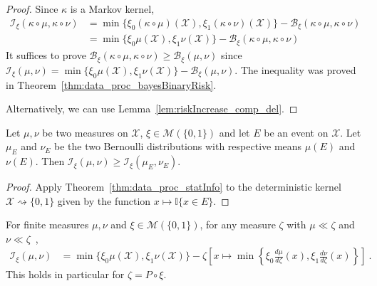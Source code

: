 \begin{proof}\leanok
{}
Since $\kappa$ is a Markov kernel,
\begin{align*}
\mathcal I_\xi(\kappa \circ \mu, \kappa \circ \nu)
&= \min\{\xi_0(\kappa \circ \mu)(\mathcal X), \xi_1(\kappa \circ \nu)(\mathcal X)\} - \mathcal B_\xi(\kappa \circ \mu, \kappa \circ \nu)
\\
&= \min\{\xi_0 \mu(\mathcal X), \xi_1 \nu(\mathcal X)\} - \mathcal B_\xi(\kappa \circ \mu, \kappa \circ \nu)
\end{align*}
It suffices to prove $\mathcal B_\xi(\kappa \circ \mu, \kappa \circ \nu) \ge \mathcal B_\xi(\mu, \nu)$ since $\mathcal I_\xi(\mu, \nu) = \min\{\xi_0\mu(\mathcal X), \xi_1\nu(\mathcal X)\} - \mathcal B_\xi(\mu, \nu)$.
The inequality was proved in Theorem~\ref{thm:data_proc_bayesBinaryRisk}.

Alternatively, we can use Lemma~\ref{lem:riskIncrease_comp_del}.
\end{proof}


\begin{corollary}
  \label{cor:statInfo_data_proc_event}
  \leanok
  Let $\mu, \nu$ be two measures on $\mathcal X$, $\xi \in \mathcal M(\{0,1\})$ and let $E$ be an event on $\mathcal X$. Let $\mu_E$ and $\nu_E$ be the two Bernoulli distributions with respective means $\mu(E)$ and $\nu(E)$.
  Then $\mathcal I_\xi(\mu, \nu) \ge \mathcal I_\xi(\mu_E, \nu_E)$.
\end{corollary}

\begin{proof}\leanok
{}
Apply Theorem~\ref{thm:data_proc_statInfo} to the deterministic kernel $\mathcal X \rightsquigarrow \{0,1\}$ given by the function $x \mapsto \mathbb{I}\{x \in E\}$.
\end{proof}


\begin{lemma}
  \label{lem:statInfo_eq_sub_min}
  \leanok
  For finite measures $\mu, \nu$ and $\xi \in \mathcal M(\{0,1\})$, for any measure $\zeta$ with $\mu \ll \zeta$ and $\nu \ll \zeta$~,
  \begin{align*}
  \mathcal I_\xi(\mu, \nu)
  &= \min\{\xi_0\mu(\mathcal X), \xi_1\nu(\mathcal X)\} - \zeta\left[x \mapsto \min \left\{\xi_0\frac{d \mu}{d\zeta}(x), \xi_1\frac{d \nu}{d\zeta}(x)\right\}\right]
  \: .
  \end{align*}
  This holds in particular for $\zeta = P \circ \xi$.
\end{lemma}

